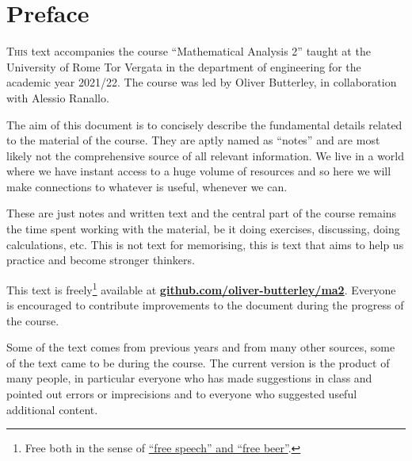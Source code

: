 \chapter{Preface}
\lettrine{T}{his} text accompanies the course ``Mathematical Analysis 2'' taught at the University of Rome Tor Vergata in the department of engineering for the academic year 2021/22.
The course was led by Oliver Butterley, in collaboration with Alessio Ranallo. 

The aim of this document is to concisely describe the fundamental details related to the material of the course.
They are aptly named as ``notes'' and are most likely not the comprehensive source of all relevant information.
We live in a world where we have instant access to a huge volume of resources and so here we will make connections to whatever is useful, whenever we can. 

These are just notes and written text and the central part of the course remains the time spent working with the material, be it doing exercises, discussing, doing calculations, etc. This is not text for memorising, this is text that aims to help us practice and become stronger thinkers.

This text is freely\footnote{Free both in the sense of \href{https://en.wikipedia.org/wiki/Gratis_versus_libre}{``free speech'' and ``free beer''}.} available at \href{https://github.com/oliver-butterley/ma2}{\textbf{github.com/oliver-butterley/ma2}}.
Everyone is encouraged to contribute improvements to the document during the progress of the course. 

Some of the text comes from previous years and from many other sources, some of the text came to be during the course.
The current version is the product of many people, in particular everyone who has made suggestions in class and pointed out errors or imprecisions and to everyone who suggested useful additional content.


